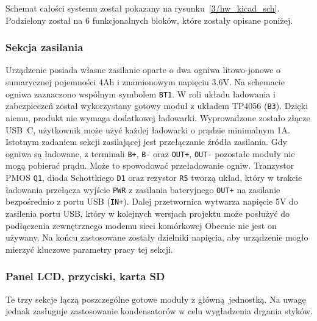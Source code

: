 \documentclass[polish]{aghengthesis}
\begin{document}
			Schemat całości systemu został pokazany na rysunku~\ref{3/hw_kicad_sch}. Podzielony został na 6 funkcjonalnych bloków, które zostały opisane poniżej.
			
			\subsubsection{Sekcja zasilania}
				Urządzenie posiada własne zasilanie oparte o dwa ogniwa litowo-jonowe o sumarycznej pojemności 4Ah i znamionowym napięciu 3.6V. Na schemacie ogniwa zaznaczono wspólnym symbolem \lstinline|BT1|. W roli układu ładowania i zabezpieczeń został wykorzystany gotowy moduł\textsuperscript{\cite{hw_mod_chg}} z układem TP4056 (\lstinline|B3|). Dzięki niemu, produkt nie wymaga dodatkowej ładowarki. Wyprowadzone zostało złącze USB~C, użytkownik może użyć każdej ładowarki o prądzie minimalnym 1A. Istotnym zadaniem sekcji zasilającej jest przełączanie źródła zasilania. Gdy ogniwa są ładowane, z terminali \lstinline|B+|, \lstinline|B-| oraz \lstinline|OUT+|, \lstinline|OUT-| pozostałe moduły nie mogą pobierać prądu. Może to spowodować przeładowanie ogniw. Tranzystor PMOS \lstinline|Q1|, dioda Schottkiego \lstinline|D1| oraz rezystor \lstinline|R5| tworzą układ\textsuperscript{\cite{hw_load_sw}}, który w trakcie ładowania przełącza  wyjście \lstinline|PWR| z zasilania bateryjnego \lstinline|OUT+| na zasilanie bezpośrednio z portu USB (\lstinline|IN+|). Dalej przetwornica wytwarza napięcie 5V do zasilenia portu USB, który w kolejnych wersjach projektu może posłużyć do podłączenia zewnętrznego modemu sieci komórkowej Obecnie nie jest on używany. Na końcu zastosowane zostały dzielniki napięcia, aby urządzenie mogło mierzyć kluczowe parametry pracy tej sekcji.
				
			\subsubsection{Panel LCD, przyciski, karta SD}
				Te trzy sekcje łączą poszczególne gotowe moduły z główną jednostką. Na uwagę jednak zasługuje zastosowanie kondensatorów w celu wygładzenia drgania styków.
				
\end{document}
